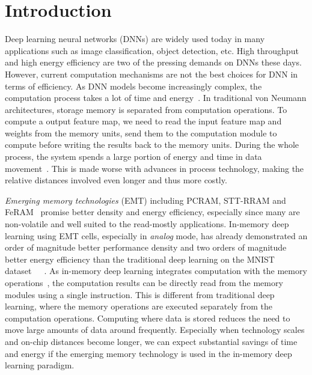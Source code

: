 \documentclass[10pt,journal,compsoc]{IEEEtran}
\begin{document}
\maketitle


 


\IEEEpeerreviewmaketitle

\section{Introduction}

Deep learning neural networks (DNNs) are widely used today in many applications such as image classification, object detection, etc. High throughput and high energy efficiency are two of the pressing demands on DNNs these days. However, current computation mechanisms are not the best choices for DNN in terms of efficiency. As DNN models become increasingly complex, the computation process takes a lot of time and energy~\cite{inference2015performance}. In traditional von Neumann architectures, storage memory is separated from computation operations. To compute a output feature map, we need to read the input feature map and weights from the memory units, send them to the computation module to compute before writing the results back to the memory units. During the whole process, the system spends a large portion of energy and time in data movement~\cite{yang2017designing}. This is made worse with advances in process technology, making the relative distances involved even longer and thus more costly.

{\em Emerging memory technologies} (EMT) including PCRAM, STT-RRAM and FeRAM~\cite{meena2014} promise better density and energy efficiency, especially since many are non-volatile and well suited to the read-mostly applications. 
In-memory deep learning using EMT cells, especially in {\em analog} mode, has already demonstrated an order of magnitude better performance density and two orders of magnitude better energy efficiency than the traditional deep learning on the MNIST dataset~\cite{yao2020fully}~\cite{cai2019fully}~\cite{luo2021nc}.
As in-memory deep learning integrates computation with the memory operations~\cite{sebastian2020memory}, the computation results can be directly read from the memory modules using a single instruction.  This is different from traditional deep learning, where the memory operations are executed separately from the computation operations. Computing where data is stored reduces the need to move large amounts of data around frequently. Especially when technology scales and on-chip distances become longer, we can expect substantial savings of time and energy if the emerging memory technology is used in the in-memory deep learning paradigm. 
\end{document}
